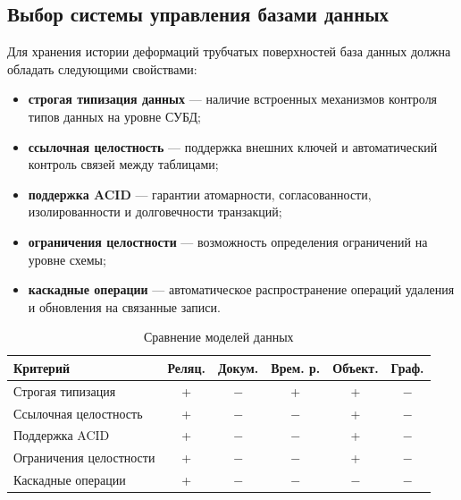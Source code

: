 \subsection{Выбор системы управления базами данных}

\noindent
\hspace{1.25cm}
Для хранения истории деформаций трубчатых поверхностей база данных должна обладать следующими свойствами:

\begin{itemize}
    \item \textbf{строгая типизация данных} --- наличие встроенных механизмов контроля типов данных на уровне СУБД;
    \item \textbf{ссылочная целостность} --- поддержка внешних ключей и автоматический контроль связей между таблицами;
    \item \textbf{поддержка ACID} --- гарантии атомарности, согласованности, изолированности и долговечности транзакций;
    \item \textbf{ограничения целостности} --- возможность определения ограничений на уровне схемы;
    \item \textbf{каскадные операции} --- автоматическое распространение операций удаления и обновления на связанные записи.
\end{itemize}

\begin{table}[H]
    \captionsetup{justification=raggedright, singlelinecheck=false}
    \caption{Сравнение моделей данных}
    \label{tbl:db_comparison}
    \begin{center}
        \begin{tabular}{|l|c|c|c|c|c|}
            \hline
            \textbf{Критерий} & \textbf{Реляц.} & \textbf{Докум.} & \textbf{Врем. р.} & \textbf{Объект.} & \textbf{Граф.} \\\hline
            Строгая типизация & + & $-$ & + & + & $-$ \\\hline
            Ссылочная целостность & + & $-$ & $-$ & + & $-$ \\\hline
            Поддержка ACID & + & $-$ & $-$ & + & $-$ \\\hline
            Ограничения целостности & + & $-$ & $-$ & + & $-$ \\\hline
            Каскадные операции & + & $-$ & $-$ & $-$ & $-$ \\\hline
        \end{tabular}
    \end{center}
\end{table}

